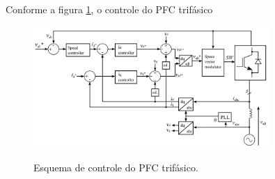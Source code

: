Conforme a figura \ref{fig:controlepfc3ph}, o controle do PFC trifásico

\begin{figure}
	\centering
	\caption{Esquema de controle do PFC trifásico.}
	\includegraphics[width=0.8\textwidth]{./Figuras/controlepfc3ph.png}
	\label{fig:controlepfc3ph}
\end{figure}